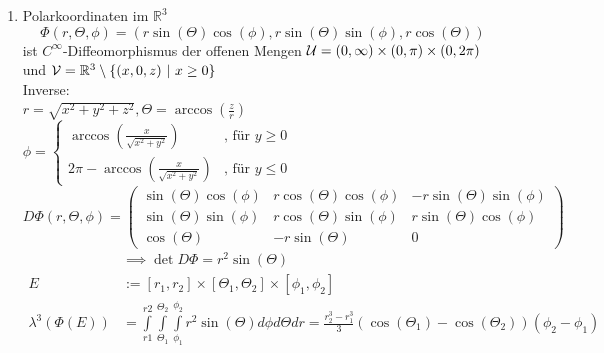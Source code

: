 \begin{example}
\begin{enumerate}
      \item Polarkoordinaten im $\mathbb{R}^3$\\
        $$\Phi(r, \Theta, \phi) = (r \sin(\Theta) \cos(\phi), r \sin(\Theta)\sin(\phi), r \cos(\Theta))$$ ist $C^{\infty}$-Diffeomorphismus der offenen Mengen $\mathcal{U} = (0,\infty) \times (0,\pi) \times (0,2\pi)$ und $\script{V} = \mathbb{R}^3 \setminus \{(x,0,z) \ | \ x \geq 0\}$\\
        Inverse:\\
        $r=\sqrt{x^2 + y^2 + z^2}, \Theta = \arccos(\frac{z}{r})$\\
        $\phi = \begin{cases}
          \arccos(\frac{x}{\sqrt{x^2 + y^2}}) & \text{, für } y \geq 0\\
          2\pi - \arccos(\frac{x}{\sqrt{x^2 + y^2}}) & \text{, für } y \leq 0
        \end{cases}$\\
        $D\Phi(r, \Theta, \phi) = \left(\begin{array}{ccc}
          \sin(\Theta)\cos(\phi) & r\cos(\Theta)\cos(\phi) & -r\sin(\Theta)\sin(\phi)\\
          \sin(\Theta)\sin(\phi) & r\cos(\Theta)\sin(\phi) & r\sin(\Theta)\cos(\phi)\\
          \cos(\Theta) & -r\sin(\Theta) & 0
        \end{array} \right)$
        \begin{align*}
          &\implies \det D\Phi = r^2 \sin(\Theta)\\
          E &:= [r_1, r_2] \times [\Theta_1, \Theta_2] \times [\phi_1, \phi_2]\\
          \lambda^3(\Phi(E)) &= \int\limits_{r1}^{r2}\int\limits_{\Theta_1}^{\Theta_2}\int\limits_{\phi_1}^{\phi_2} r^2 \sin(\Theta) d\phi d\Theta dr = \frac{r_2^3 - r_1^3}{3} (\cos(\Theta_1) - \cos(\Theta_2)) (\phi_2 - \phi_1)
        \end{align*}
    \end{enumerate}
  \end{example}

